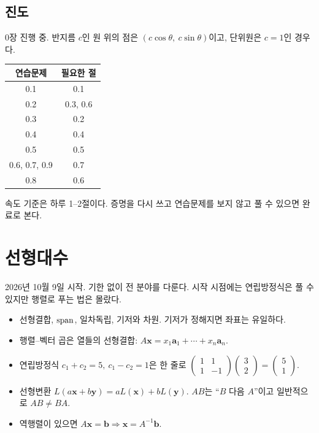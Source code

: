 \documentclass[11pt]{article}
\begin{document}
\subsection{진도}
0장 진행 중. 반지름 $c$인 원 위의 점은 $(c\cos\theta,\ c\sin\theta)$이고, 단위원은 $c=1$인 경우다.

\begin{center}
\begin{tabular}{cc}
\toprule
연습문제 & 필요한 절\\
\midrule
0.1 & 0.1\\
0.2 & 0.3, 0.6\\
0.3 & 0.2\\
0.4 & 0.4\\
0.5 & 0.5\\
0.6, 0.7, 0.9 & 0.7\\
0.8 & 0.6\\
\bottomrule
\end{tabular}
\end{center}
속도 기준은 하루 1–2절이다. 증명을 다시 쓰고 연습문제를 보지 않고 풀 수 있으면 완료로 본다.

\section{선형대수}
2026년 10월 9일 시작. 기한 없이 전 분야를 다룬다. 시작 시점에는 연립방정식은 풀 수 있지만 행렬로 푸는 법은 몰랐다.

\begin{itemize}[nosep]
\item 선형결합, $\operatorname{span}$, 일차독립, 기저와 차원. 기저가 정해지면 좌표는 유일하다.
\item 행렬–벡터 곱은 열들의 선형결합: $A\mathbf x=x_1\mathbf a_1+\cdots+x_n\mathbf a_n$.
\item 연립방정식 $c_1+c_2=5,\ c_1-c_2=1$은 한 줄로
$\begin{pmatrix}1&1\\1&-1\end{pmatrix}\begin{pmatrix}3\\2\end{pmatrix}=\begin{pmatrix}5\\1\end{pmatrix}$.
\item 선형변환 $L(a\mathbf x+b\mathbf y)=aL(\mathbf x)+bL(\mathbf y)$. $AB$는 ``$B$ 다음 $A$''이고 일반적으로 $AB\ne BA$.
\item 역행렬이 있으면 $A\mathbf x=\mathbf b\Rightarrow\mathbf x=A^{-1}\mathbf b$.
\end{itemize}

\end{document}
